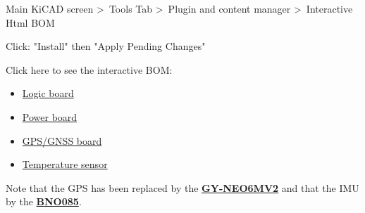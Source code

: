 \documentclass[ti,oneside,10pt]{uantwerpenreport}
\begin{document}
Main KiCAD screen \textgreater~Tools Tab \textgreater~Plugin and content manager \textgreater~Interactive Html BOM

Click: "Install" then "Apply Pending Changes"

Click here to see the interactive BOM:
\begin{itemize}
    \item \href{../../cad/KiCAD/v2/1_logic_board/bom/ibom.html}{Logic board}
    \item \href{../../cad/KiCAD/v2/2_power_board/bom/ibom.html}{Power board}
    \item \href{../../cad/KiCAD/v2/sensor_position/bom/ibom.html}{GPS/GNSS board}
    \item \href{../../cad/KiCAD/v2/sensor_temperature/bom/ibom.html}{Temperature sensor}
\end{itemize}

Note that the GPS has been replaced by the \href{https://www.otronic.nl/nl/gps-module-gy-neo6mv2-met-antenne-voor-a-140568422.html}{\textbf{GY-NEO6MV2}} and that the IMU by the \href{https://www.digikey.be/nl/products/detail/adafruit-industries-llc/4754/13426653?s=N4IgTCBcDaIEIDkDyAGAHAVhAXQL5A}{\textbf{BNO085}}.
\end{document}
